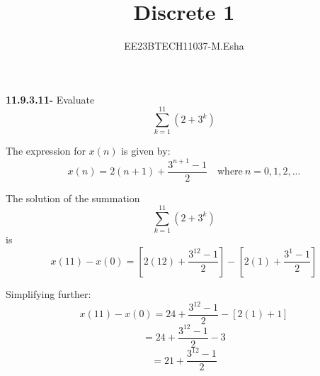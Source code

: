 \documentclass{article}
\title{Discrete 1}
\author{EE23BTECH11037-M.Esha}
\date{}
\begin{document}
\maketitle
\textbf{11.9.3.11-} Evaluate 
\[
\sum_{k=1}^{11} (2 + 3^k)
\]

The expression for \(x(n)\) is given by:
\[
x(n) = 2(n+1) + \frac{3^{n+1} - 1}{2} \quad \text{where} \ n=0,1,2,...
\]

The solution of the summation
\[
\sum_{k=1}^{11} (2 + 3^k)
\]
is
\[
x(11) - x(0) = \left[2(12) + \frac{3^{12} - 1}{2}\right] - \left[2(1) + \frac{3^{1} - 1}{2}\right]
\]

Simplifying further:
\[
x(11) - x(0) = 24 + \frac{3^{12} - 1}{2} - \left[2(1) + 1\right]
\]
\[
= 24 + \frac{3^{12} - 1}{2} - 3
\]
\[
= 21+ \frac{3^{12} - 1}{2}
\]
\end{document}
